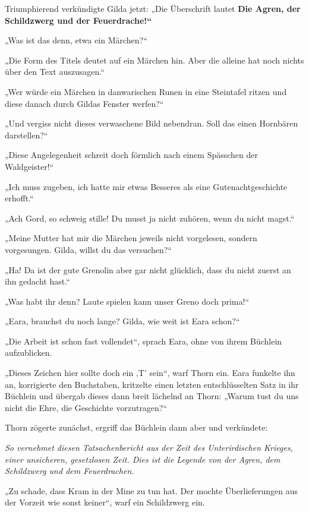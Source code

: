 Triumphierend verkündigte Gilda jetzt: „Die Überschrift lautet \textbf{Die Agren, der Schildzwerg und der Feuerdrache!“}

„Was ist das denn, etwa ein Märchen?“

„Die Form des Titels deutet auf ein Märchen hin. Aber die alleine hat noch nichts über den Text auszusagen.“

„Wer würde ein Märchen in danwarischen Runen in eine Steintafel ritzen und diese danach durch Gildas Fenster werfen?“

„Und vergiss nicht dieses verwaschene Bild nebendran. Soll das einen Hornbären darstellen?“

„Diese Angelegenheit schreit doch förmlich nach einem Spässchen der Waldgeister!“

„Ich muss zugeben, ich hatte mir etwas Besseres als eine Gutenachtgeschichte erhofft.“

„Ach Gord, so schweig stille! Du musst ja nicht zuhören, wenn du nicht magst.“

„Meine Mutter hat mir die Märchen jeweils nicht vorgelesen, sondern vorgesungen. Gilda, willst du das versuchen?“

„Ha! Da ist der gute Grenolin aber gar nicht glücklich, dass du nicht zuerst an ihn gedacht hast.“

„Was habt ihr denn? Laute spielen kann unser Greno doch prima!“

„Eara, brauchst du noch lange? Gilda, wie weit ist Eara schon?“

„Die Arbeit ist schon fast vollendet“, sprach Eara, ohne von ihrem Büchlein aufzublicken.

„Dieses Zeichen hier sollte doch ein ‚T’ sein“, warf Thorn ein. Eara funkelte ihn an, korrigierte den Buchstaben, kritzelte einen letzten entschlüsselten Satz in ihr Büchlein und übergab dieses dann breit lächelnd an Thorn: „Warum tust du uns nicht die Ehre, die Geschichte vorzutragen?“

Thorn zögerte zunächst, ergriff das Büchlein dann aber und verkündete:\bigskip



\textit{So vernehmet diesen Tatsachenbericht aus der Zeit des Unterirdischen Krieges, einer unsicheren, gesetzlosen Zeit. Dies ist die Legende von der Agren, dem Schildzwerg und dem Feuerdrachen.}\bigskip



„Zu schade, dass Kram in der Mine zu tun hat. Der mochte Überlieferungen aus der Vorzeit wie sonst keiner“, warf ein Schildzwerg ein.

